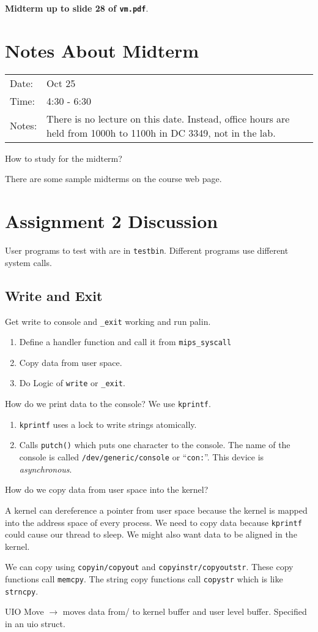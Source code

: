 \documentclass[12pt]{article}
\begin{document}
\textbf{Midterm up to slide 28 of \texttt{vm.pdf}}.

\section{Notes About Midterm}

\begin{tabular}{lp{400pt}}
	Date: & Oct 25\\
	Time: & 4:30 - 6:30\\
	Notes: & There is no lecture on this date. Instead, office hours are held
	from 1000h to 1100h in DC 3349, not in the lab.\\
\end{tabular}

How to study for the midterm?

There are some sample midterms on the course web page.

\section{Assignment 2 Discussion}

User programs to test with are in \texttt{testbin}. Different programs use
different system calls.

\subsection{Write and Exit}

Get write to console and \texttt{\_exit} working and run palin.
\begin{enumerate}
	\item Define a handler function and call it from
		\texttt{mips\_syscall}
	\item Copy data from user space.
	\item Do Logic of \texttt{write} or \texttt{\_exit}.
\end{enumerate}

How do we print data to the console? We use \texttt{kprintf}.
\begin{enumerate}
	\item \texttt{kprintf} uses a lock to write strings atomically.
	\item Calls \texttt{putch()} which puts one character to the console. The
		name of the console is called \texttt{/dev/generic/console} or
		``\texttt{con:}''. This device is \emph{asynchronous}.
\end{enumerate}

How do we copy data from user space into the kernel?

A kernel can dereference a pointer from user space because the kernel is mapped
into the address space of every process. We need to copy data because
\texttt{kprintf} could cause our thread to sleep. We might also want data to be
aligned in the kernel.

We can copy using \texttt{copyin/copyout} and \texttt{copyinstr/copyoutstr}.
These copy functions call \texttt{memcpy}. The string copy functions call
\texttt{copystr} which is like \texttt{strncpy}.

UIO Move $\to$ moves data from/ to kernel buffer and user level buffer.
Specified in an uio struct.
\end{document}
